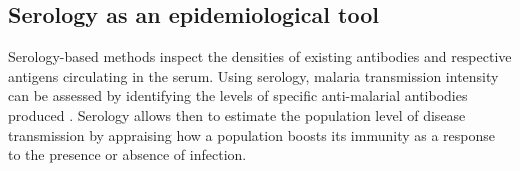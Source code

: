 

\subsection{Serology as an epidemiological tool}

Serology-based methods inspect the densities of existing antibodies and respective antigens circulating in the serum.
Using serology, malaria transmission intensity can be assessed by identifying the levels of specific anti-malarial antibodies produced \cite{corran2007serology, drakeley2005estimating}.
Serology allows then to estimate the population level of disease transmission by appraising how a population boosts its immunity as a response to the presence or absence of infection.

